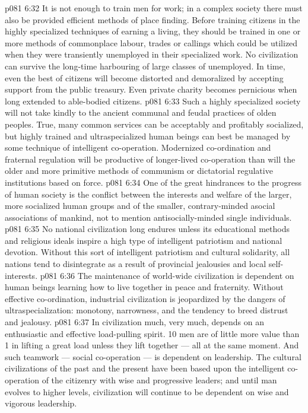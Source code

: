 \vs p081 6:32 It is not enough to train men for work; in a complex society there must also be provided efficient methods of place finding. Before training citizens in the highly specialized techniques of earning a living, they should be trained in one or more methods of commonplace labour, trades or callings which could be utilized when they were transiently unemployed in their specialized work. No civilization can survive the long\hyp{}time harbouring of large classes of unemployed. In time, even the best of citizens will become distorted and demoralized by accepting support from the public treasury. Even private charity becomes pernicious when long extended to able\hyp{}bodied citizens.
\vs p081 6:33 Such a highly specialized society will not take kindly to the ancient communal and feudal practices of olden peoples. True, many common services can be acceptably and profitably socialized, but highly trained and ultraspecialized human beings can best be managed by some technique of intelligent co\hyp{}operation. Modernized co\hyp{}ordination and fraternal regulation will be productive of longer\hyp{}lived co\hyp{}operation than will the older and more primitive methods of communism or dictatorial regulative institutions based on force.
\vs p081 6:34 \bibnobreakspace {} One of the great hindrances to the progress of human society is the conflict between the interests and welfare of the larger, more socialized human groups and of the smaller, contrary\hyp{}minded asocial associations of mankind, not to mention antisocially\hyp{}minded single individuals.
\vs p081 6:35 No national civilization long endures unless its educational methods and religious ideals inspire a high type of intelligent patriotism and national devotion. Without this sort of intelligent patriotism and cultural solidarity, all nations tend to disintegrate as a result of provincial jealousies and local self\hyp{}interests.
\vs p081 6:36 The maintenance of world\hyp{}wide civilization is dependent on human beings learning how to live together in peace and fraternity. Without effective co\hyp{}ordination, industrial civilization is jeopardized by the dangers of ultraspecialization: monotony, narrowness, and the tendency to breed distrust and jealousy.
\vs p081 6:37 \bibnobreakspace {} In civilization much, very much, depends on an enthusiastic and effective load\hyp{}pulling spirit. 10 men are of little more value than 1 in lifting a great load unless they lift together --- all at the same moment. And such teamwork --- social co\hyp{}operation --- is dependent on leadership. The cultural civilizations of the past and the present have been based upon the intelligent co\hyp{}operation of the citizenry with wise and progressive leaders; and until man evolves to higher levels, civilization will continue to be dependent on wise and vigorous leadership.
